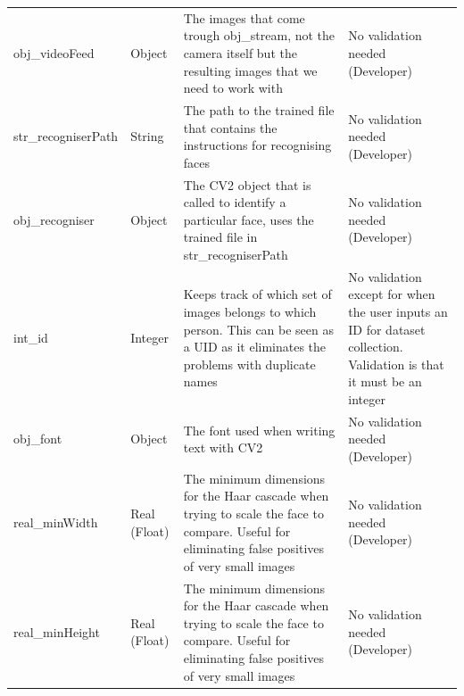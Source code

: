 \documentclass[9pt]{article}
\begin{document}
\begin{table}[H]
\begin{tabularx}{\textwidth}{llXX}
		obj\_videoFeed         & Object             & The images that come trough obj\_stream, not the camera itself but the resulting images that we need to work with                                 & No validation needed (Developer)                                                                                                        \\
		str\_recogniserPath    & String             & The path to the trained file that contains the instructions for recognising faces                                                                 & No validation needed (Developer)                                                                                                        \\
		obj\_recogniser        & Object             & The CV2 object that is called to identify a particular face, uses the trained file in str\_recogniserPath                                         & No validation needed (Developer)                                                                                                        \\
		int\_id                & Integer            & Keeps track of which set of images belongs to which person. This can be seen as a UID as it eliminates the problems with duplicate names          & No validation except for when the user inputs an ID for dataset collection. Validation is that it must be an integer \\
		obj\_font              & Object             & The font used when writing text with CV2                                                                                                          & No validation needed (Developer)                                                                                                        \\
		real\_minWidth         & Real (Float)       & The minimum dimensions for the Haar cascade when trying to scale the face to compare. Useful for eliminating false positives of very small images & No validation needed (Developer)                                                                                                        \\
		real\_minHeight        & Real (Float)       & The minimum dimensions for the Haar cascade when trying to scale the face to compare. Useful for eliminating false positives of very small images & No validation needed (Developer)                                                                                                        \\

\end{tabularx}
\end{table}
\end{document}
